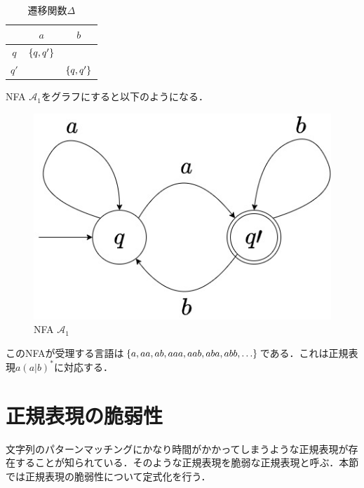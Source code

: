 \documentclass[a4paper, 12pt, dvipdfmx, uplatex]{jsreport}
\begin{document}
\begin{table}[H]
  \centering
  \caption{遷移関数$\Delta$\label{delta}}
  \begin{tabular}{c|c|c} \hline \hline
       & $a$  &$b$ \\\hline
    $q$  & $\qty{q,q'}$ &$\qty{}$ \\\hline
    $q'$ & $\qty{}$  &$\qty{q,q'}$ \\\hline
  \end{tabular}
\end{table}

NFA $\mathcal{A}_1$をグラフにすると以下のようになる．
\begin{figure}[H] %
  \centering
  \includegraphics[width=0.5\linewidth]{../figures/nfa.jpg}
  \caption{NFA $\mathcal{A}_1$\label{nfa_example}}
\end{figure}

このNFAが受理する言語は$\qty{a,aa,ab,aaa,aab,aba,abb,\ldots}$である．これは正規表現$a(a|b)^*$に対応する．


\section{正規表現の脆弱性}
文字列のパターンマッチングにかなり時間がかかってしまうような正規表現が存在することが知られている．そのような正規表現を脆弱な正規表現と呼ぶ．本節では正規表現の脆弱性について定式化を行う．
\end{document}
